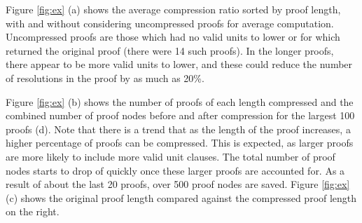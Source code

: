 
Figure \ref{fig:ex} (a) shows the average compression ratio sorted by proof length, with and without considering uncompressed proofs for average computation. Uncompressed proofs are those which had no valid units to lower or for which \SFOLowerUnits returned the original proof (there were 14 such proofs). In the longer proofs, there appear to be more valid units to lower, and these could reduce the number of resolutions in the proof by as much as 20\%.

Figure \ref{fig:ex} (b) shows the number of proofs of each length compressed and the combined number of proof nodes before and after compression for the largest 100 proofs (d). Note that there is a trend that as the length of the proof increases, a higher percentage of proofs can be compressed. This is expected, as larger proofs are more likely to include more valid unit clauses. The total number of proof nodes starts to drop of quickly once these larger proofs are accounted for. As a result of about the last 20 proofs, over 500 proof nodes are saved. Figure \ref{fig:ex} (c) shows the original proof length compared against the compressed proof length on the right.








